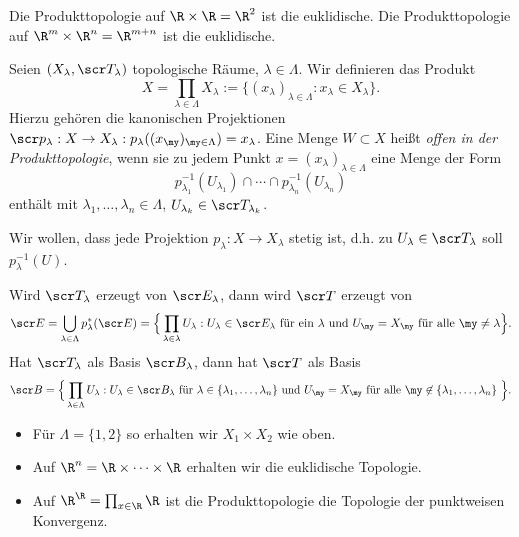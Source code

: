 \begin{ex}
	Die Produkttopologie auf $\R \times \R = \R^2$ ist die euklidische.
	Die Produkttopologie auf $\R^m \times \R^n = \R^{m+n}$ ist die euklidische.
\end{ex}

\begin{df}
	Seien $(X_\lambda, \scr T_\lambda)$ topologische Räume, $\lambda \in \Lambda$.
	Wir definieren das Produkt
	\[
		X = \prod_{\lambda\in\Lambda} X_\lambda
		:= \big\{ (x_\lambda)_{\lambda\in\Lambda} : x_\lambda \in X_\lambda \big\}.
	\]
	Hierzu gehören die kanonischen Projektionen $\scr p_\lambda: X \to X_\lambda: p_\lambda((x_\my)_{\my\in\Lambda}) = x_\lambda$.
	Eine Menge $W \subset X$ heißt \emph{offen in der Produkttopologie}, wenn sie zu jedem Punkt $x=(x_\lambda)_{\lambda\in\Lambda}$ eine Menge der Form
	\[
		p_{\lambda_1}^{-1}(U_{\lambda_1})
		\cap \dotsb \cap
		p_{\lambda_n}^{-1}(U_{\lambda_n})
	\]
	enthält mit $\lambda_1, \dotsc, \lambda_n \in \Lambda$, $U_{\lambda_k} \in \scr T_{\lambda_k}$.
	\begin{note}
		Wir wollen, dass jede Projektion $p_\lambda : X \to X_\lambda$ stetig ist, d.h. zu $U_\lambda \in \scr T_\lambda$ soll $p_\lambda^{-1}(U)$.
	\end{note}
	\begin{note}
		Wird $\scr T_\lambda$ erzeugt von $\scr E_\lambda$, dann wird $\scr T$ erzeugt von
		\[
			\scr E
			= \bigcup_{\lambda\in\Lambda} p_\lambda^*(\scr E)
			= \Big\{ \prod_{\lambda\in\lambda} U_\lambda : U_\lambda \in \scr E_\lambda \text{ für ein $\lambda$ und $U_\my = X_\my$ für alle $\my \neq \lambda$} \Big\}.
		\]
		Hat $\scr T_\lambda$ als Basis $\scr B_\lambda$, dann hat $\scr T$ als Basis
		\[
			\scr B =
			\Big\{ \prod_{\lambda\in\Lambda} U_\lambda
			: \text{$U_\lambda \in \scr B_\lambda$ für $\lambda \in \{\lambda_1, \dotsc, \lambda_n\}$ und $U_\my = X_\my$ für alle $\my \not\in \{\lambda_1, \dotsc, \lambda_n\}$ } \Big\}.
		\]
	\end{note}
\end{df}

\begin{ex}
	\begin{itemize}
		\item
			Für $\Lambda = \{1,2\}$ so erhalten wir $X_1 \times X_2$ wie oben.
		\item
			Auf $\R^n = \R \times \dotsb \times \R$ erhalten wir die euklidische Topologie.
		\item
			Auf $\R^\R = \prod_{x\in\R} \R$ ist die Produkttopologie die Topologie der punktweisen Konvergenz.
	\end{itemize}
\end{ex}

